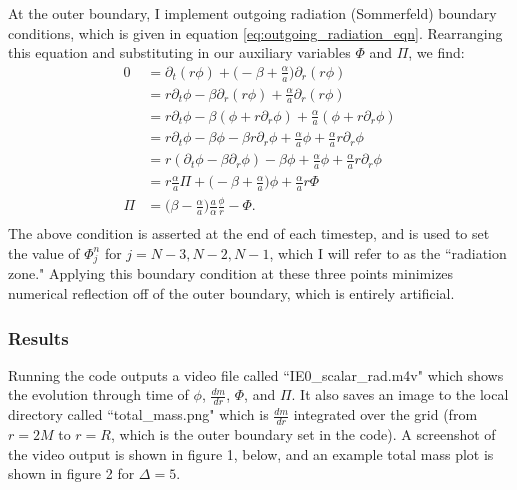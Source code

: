 \documentclass[12pt]{article}
\numberwithin{equation}{section}
\begin{document}
At the outer boundary, I implement outgoing radiation (Sommerfeld) boundary conditions, which is given in equation \ref{eq:outgoing_radiation_eqn}.  Rearranging this equation and substituting in our auxiliary variables $\Phi$ and $\Pi$, we find:
\begin{equation}
\begin{aligned}
0 &= \partial_t (r \phi) + \Big( -\beta + \frac{\alpha}{a} \Big) \partial_r (r \phi) \\
&= r \partial_t \phi - \beta \partial_r (r \phi) + \frac{\alpha}{a} \partial_r (r \phi) \\
&= r \partial_t \phi - \beta (\phi + r \partial_r \phi) + \frac{\alpha}{a} (\phi + r \partial_r \phi) \\
&= r \partial_t \phi - \beta \phi - \beta r \partial_r \phi + \frac{\alpha}{a} \phi + \frac{\alpha}{a} r \partial_r \phi \\
&= r (\partial_t \phi - \beta \partial_r \phi) - \beta \phi + \frac{\alpha}{a} \phi + \frac{\alpha}{a} r \partial_r \phi \\
&= r \frac{\alpha}{a} \Pi + \Big( - \beta + \frac{\alpha}{a} \Big) \phi + \frac{\alpha}{a} r \Phi \\
\Pi &= \Big(\beta - \frac{\alpha}{a} \Big) \frac{a}{\alpha} \frac{\phi}{r} - \Phi. \\
\end{aligned}
\end{equation}
The above condition is asserted at the end of each timestep, and is used to set the value of $\Phi^{n}_{j}$ for $j = N-3, N-2, N-1$, which I will refer to as the ``radiation zone."  Applying this boundary condition at these three points minimizes numerical reflection off of the outer boundary, which is entirely artificial.

\subsubsection{Results}
Running the code outputs a video file called ``IE0\_scalar\_rad.m4v" which shows the evolution through time of $\phi$, $\frac{d m}{d r}$, $\Phi$, and $\Pi$.  It also saves an image to the local directory called ``total\_mass.png" which is $\frac{d m}{d r}$ integrated over the grid (from $r = 2 M$ to $r = R$, which is the outer boundary set in the code).  A screenshot of the video output is shown in figure 1, below, and an example total mass plot is shown in figure 2 for $\Delta = 5$.
\end{document}
